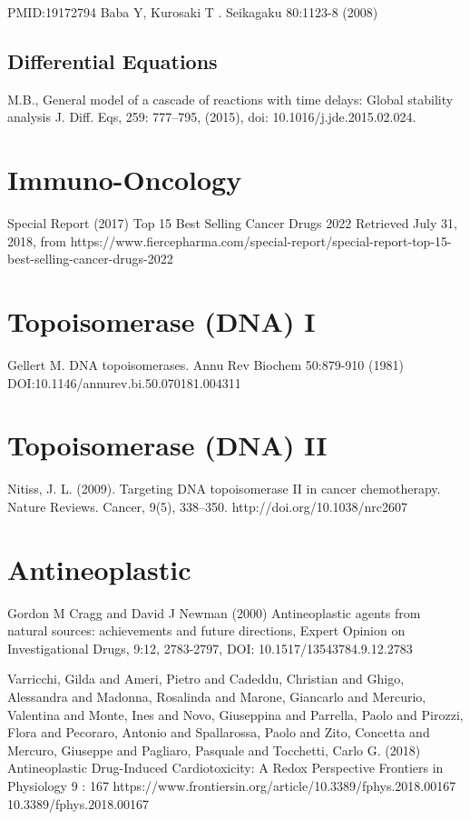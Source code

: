 \begin{thebibliography}{00}
PMID:19172794
 Baba Y, Kurosaki T
.
\newblock Seikagaku 80:1123-8 (2008)


\subsection{Differential Equations}

M.B., 
\newblock General model of a cascade of reactions with time delays: Global stability analysis
\newblock J. Diff. Eqs, 259: 777–795, (2015), doi: 10.1016/j.jde.2015.02.024.


\section{Immuno-Oncology}

Special Report (2017)
\newblock Top 15 Best Selling Cancer Drugs 2022
\newblock Retrieved July 31, 2018, from https://www.fiercepharma.com/special-report/special-report-top-15-best-selling-cancer-drugs-2022

\section{Topoisomerase (DNA) I}

Gellert M.
\newblock DNA topoisomerases.
\newblock Annu Rev Biochem 50:879-910 (1981) DOI:10.1146/annurev.bi.50.070181.004311

\section{Topoisomerase (DNA) II}

Nitiss, J. L. (2009). 
\newblock Targeting DNA topoisomerase II in cancer chemotherapy. Nature Reviews. 
\newblock Cancer, 9(5), 338–350. http://doi.org/10.1038/nrc2607


\section{Antineoplastic}

Gordon M Cragg and David J Newman (2000) 
\newblock Antineoplastic agents from natural sources: achievements and future directions, 
\newblock Expert Opinion on Investigational Drugs, 9:12, 2783-2797, DOI: 10.1517/13543784.9.12.2783

Varricchi, Gilda and Ameri, Pietro and Cadeddu, Christian and Ghigo, Alessandra and Madonna, Rosalinda and Marone, Giancarlo and Mercurio, Valentina and Monte, Ines and Novo, Giuseppina and Parrella, Paolo and Pirozzi, Flora and Pecoraro, Antonio and Spallarossa, Paolo and Zito, Concetta and Mercuro, Giuseppe and Pagliaro, Pasquale and Tocchetti, Carlo G. (2018)  
\newblock Antineoplastic Drug-Induced Cardiotoxicity: A Redox Perspective 
\newblock Frontiers in Physiology 9 : 167  https://www.frontiersin.org/article/10.3389/fphys.2018.00167 10.3389/fphys.2018.00167


\end{thebibliography}
